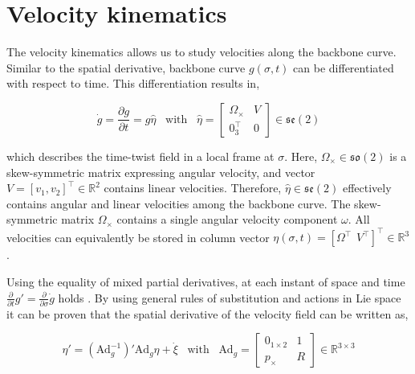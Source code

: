 \section{Velocity kinematics}

The velocity kinematics allows us to study velocities along the backbone curve. Similar to the spatial derivative, backbone curve $g(\sigma,t)$ can be differentiated with respect to time. This differentiation results in, 

\begin{equation}
  \Dot{g} = \frac{\partial g}{\partial t} = g \hat{\eta} \hspace{10pt} \text{with} \hspace{10pt}  \hat{\eta} = \begin{bmatrix} \Omega_\times & V \\ 0_3^\top & 0 \end{bmatrix} \in  \mathfrak{se}(2)
    \label{eq2:dgdt}
\end{equation}

which describes the time-twist field in a local frame at $\sigma$. Here, $\Omega_\times \in \mathfrak{so}(2)$ is a skew-symmetric matrix expressing angular velocity, and vector $V = [v_1,v_2]^\top \in \mathbb{R}^2$ contains linear velocities. Therefore, $\hat{\eta} \in \mathfrak{se}(2)$ effectively contains angular and linear velocities among the backbone curve. The skew-symmetric matrix $\Omega_\times$ contains a single angular velocity component $\omega$. All velocities can equivalently be stored in column vector $\eta(\sigma,t) = [\Omega^\top \hspace{5pt} V^\top]^\top \in \mathbb{R}^3$ \cite{Sola2018}.

Using the equality of mixed partial derivatives, at each instant of space and time $\frac{\partial}{\partial t}g' = \frac{\partial}{\partial \sigma}\dot{g}$ holds \cite{Caasenbrood2020}. By using general rules of substitution and actions in Lie space it can be proven that the spatial derivative of the velocity field can be written as,

\begin{equation}
    \eta'= (\text{Ad}_g^{-1})'\text{Ad}_g \eta + \Dot{\xi} \hspace{10pt} \text{with} \hspace{10pt} \text{Ad}_g = \begin{bmatrix} 0_{1 \times 2} & 1 \\ p_\times & R  \end{bmatrix} \in \mathbb{R}^{3\times 3}
    \label{eq2:etadif}
\end{equation}


